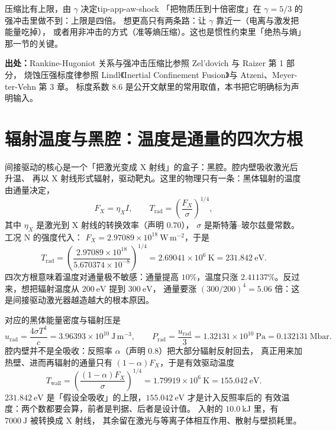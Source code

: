 \begin{tip}{压缩比有上限，由 $\gamma$ 决定}{tip-app-aw-shock}
「把物质压到十倍密度」在 $\gamma=5/3$ 的强冲击里做不到：上限是四倍。
想更高只有两条路：让 $\gamma$ 靠近一（电离与激发把能量吃掉），
或者用非冲击的方式（准等熵压缩）。这也是惯性约束里「绝热与熵」那一节的关键。
\end{tip}

{\footnotesize
\textbf{出处：}Rankine-Hugoniot 关系与强冲击压缩比参照 Zel'dovich 与 Raizer 第 1 部分，
烧蚀压强标度律参照 Lindl《Inertial Confinement Fusion》与 Atzeni、Meyer-ter-Vehn 第 3 章。
标度系数 $8.6$ 是公开文献里的常用取值，本书把它明确标为声明输入。
}

\section{辐射温度与黑腔：温度是通量的四次方根}
\label{sec:app-aw-radiation}

间接驱动的核心是一个「把激光变成 X 射线」的盒子：黑腔。腔内壁吸收激光后升温、
再以 X 射线形式辐射，驱动靶丸。这里的物理只有一条：黑体辐射的温度由通量决定，
\begin{equation}
F_X=\eta_XI,\qquad
T_\mathrm{rad}=\left(\frac{F_X}{\sigma}\right)^{1/4},
\label{eq:app-aw-trad}
\end{equation}
其中 $\eta_X$ 是激光到 X 射线的转换效率（声明 $0.70$），
$\sigma$ 是斯特藩--玻尔兹曼常数。工况 N 的强度代入：
$F_X=2.97089\times10^{18}\ \mathrm{W\,m^{-2}}$，于是
\begin{equation}
T_\mathrm{rad}=\left(\frac{2.97089\times10^{18}}{5.670374\times10^{-8}}\right)^{1/4}
=2.69041\times10^{6}\ \mathrm{K}=231.842\ \mathrm{eV}.
\label{eq:app-aw-trad2}
\end{equation}
四次方根意味着温度对通量极不敏感：通量提高 $10\%$，温度只涨
$2.41137\%$。反过来，想把辐射温度从 $200\ \mathrm{eV}$ 提到 $300\ \mathrm{eV}$，
通量要涨 $(300/200)^4=5.06$ 倍：这是间接驱动激光器越造越大的根本原因。

对应的黑体能量密度与辐射压是
\begin{equation}
u_\mathrm{rad}=\frac{4\sigma T^4}{c}=3.96393\times10^{10}\ \mathrm{J\,m^{-3}},
\qquad
P_\mathrm{rad}=\frac{u_\mathrm{rad}}{3}=1.32131\times10^{10}\ \mathrm{Pa}
=0.132131\ \mathrm{Mbar}.
\label{eq:app-aw-urad}
\end{equation}
腔内壁并不是全吸收：反照率 $\alpha$（声明 $0.8$）把大部分辐射反射回去，
真正用来加热壁、进而再辐射的通量只有 $(1-\alpha)F_X$，于是有效驱动温度
\begin{equation}
T_\mathrm{wall}=\left(\frac{(1-\alpha)F_X}{\sigma}\right)^{1/4}
=1.79919\times10^{6}\ \mathrm{K}=155.042\ \mathrm{eV}.
\label{eq:app-aw-wall}
\end{equation}
$231.842\ \mathrm{eV}$ 是「假设全吸收」的上限，$155.042\ \mathrm{eV}$ 才是计入反照率后的
有效温度：两个数都要会算，前者是判据、后者是设计值。
入射的 $10.0\ \mathrm{kJ}$ 里，有 $7000\ \mathrm{J}$ 被转换成 X 射线，
其余留在激光与等离子体相互作用、散射与壁损耗里。


